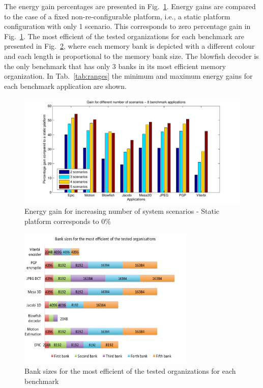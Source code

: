 The energy gain percentages are presented in Fig.~\ref{fig:gainsC}. 
Energy gains are compared to the case of a fixed non-re-configurable platform, i.e., a static platform configuration with only 1 scenario. 
This corresponds to zero percentage gain in Fig.~\ref{fig:gainsC}. 
The most efficient of the tested organizations for each benchmark are presented in Fig.~\ref{fig:banksC}, where each memory bank is depicted with a different colour and each length is proportional to the memory bank size. 
The blowfish decoder is the only benchmark that has only 3 banks in its most efficient memory organization. 
In Tab.~\ref{tab:ranges} the minimum and maximum energy gains for each benchmark application are shown.

\begin{figure}
\centering
\includegraphics[width=1.1\textwidth]{C/6appsGains.pdf}
\caption{Energy gain for increasing number of system scenarios - Static platform corresponds to 0\%}
\label{fig:gainsC}
\end{figure}

\begin{figure}
\centering
\includegraphics[width=0.75\textwidth]{C/banks2.pdf}
\caption{Bank sizes for the most efficient of the tested organizations for each benchmark}
\label{fig:banksC}
\end{figure}

